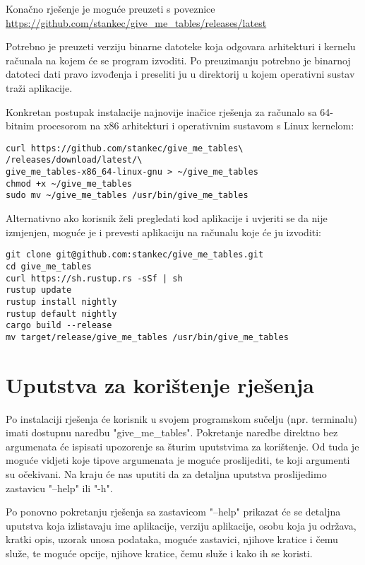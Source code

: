 \documentclass[times, utf8, zavrsni]{fer}
\begin{document}
Konačno rješenje je moguće preuzeti s poveznice
\url{https://github.com/stankec/give_me_tables/releases/latest}

Potrebno je preuzeti verziju binarne datoteke koja odgovara arhitekturi i
kernelu računala na kojem će se program izvoditi. Po preuzimanju potrebno je
binarnoj datoteci dati pravo izvođenja i preseliti ju u direktorij u kojem
operativni sustav traži aplikacije.

Konkretan postupak instalacije najnovije inačice rješenja za računalo sa
64-bitnim procesorom na x86 arhitekturi i operativnim sustavom s Linux kernelom:

\begin{lstlisting}
curl https://github.com/stankec/give_me_tables\
/releases/download/latest/\
give_me_tables-x86_64-linux-gnu > ~/give_me_tables
chmod +x ~/give_me_tables
sudo mv ~/give_me_tables /usr/bin/give_me_tables
\end{lstlisting}

Alternativno ako korisnik želi pregledati kod aplikacije i uvjeriti se da nije
izmjenjen, moguće je i prevesti aplikaciju na računalu koje će ju izvoditi:

\begin{lstlisting}
git clone git@github.com:stankec/give_me_tables.git
cd give_me_tables
curl https://sh.rustup.rs -sSf | sh
rustup update
rustup install nightly
rustup default nightly
cargo build --release
mv target/release/give_me_tables /usr/bin/give_me_tables
\end{lstlisting}

\section{Uputstva za korištenje rješenja}

Po instalaciji rješenja će korisnik u svojem programskom sučelju
(npr. terminalu) imati dostupnu naredbu "give\_me\_tables". Pokretanje naredbe
direktno bez argumenata će ispisati upozorenje sa šturim uputstvima za
korištenje. Od tuda je moguće vidjeti koje tipove argumenata je moguće
proslijediti, te koji argumenti su očekivani. Na kraju će nas uputiti da za
detaljna uputstva proslijedimo zastavicu "--help" ili "-h".

Po ponovno pokretanju rješenja sa zastavicom "--help" prikazat će se detaljna
uputstva koja izlistavaju ime aplikacije, verziju aplikacije, osobu koja ju
održava, kratki opis, uzorak unosa podataka, moguće zastavici, njihove kratice
i čemu služe, te moguće opcije, njihove kratice, čemu služe i kako ih se
koristi.
\end{document}
